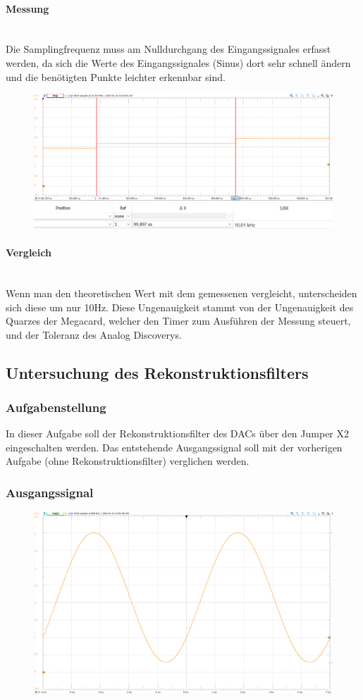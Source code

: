 \documentclass{article}
\begin{document}
\newpage
\paragraph{Messung}\mbox{}\\
Die Samplingfrequenz muss am Nulldurchgang des Eingangssignales erfasst werden, da sich die Werte des Eingangssignales (Sinus) dort sehr schnell ändern und die benötigten Punkte leichter erkennbar sind.
\begin{figure}[h]
    \centering
    \includegraphics[width=0.75\linewidth]{img/Messung_Signal_02.png}
    \includegraphics[width=0.75\linewidth]{img/Messung_02.png}
\end{figure}

\paragraph{Vergleich}\mbox{}\\
Wenn man den theoretischen Wert mit dem gemessenen vergleicht, unterscheiden sich diese um nur 10Hz. Diese Ungenauigkeit stammt von der Ungenauigkeit des Quarzes der Megacard, welcher den Timer zum Ausführen der Messung steuert, und der Toleranz des Analog Discoverys. 

\subsection{Untersuchung des Rekonstruktionsfilters}
\subsubsection{Aufgabenstellung}
In dieser Aufgabe soll der Rekonstruktionsfilter des DACs über den Jumper X2 eingeschalten werden. Das entstehende Ausgangssignal soll mit der vorherigen Aufgabe (ohne Rekonstruktionsfilter) verglichen werden.
\subsubsection{Ausgangssignal}
\begin{figure}[h]
    \centering
    \includegraphics[width=0.6\linewidth]{img/Signal_03.png}
\end{figure}
\end{document}

